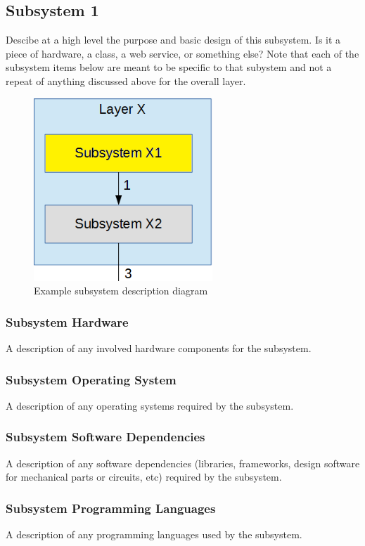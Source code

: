\subsection{Subsystem 1}
Descibe at a high level the purpose and basic design of this subsystem. Is it a piece of hardware, a class, a web service, or something else? Note that each of the subsystem items below are meant to be specific to that subystem and not a repeat of anything discussed above for the overall layer.

\begin{figure}[h!]
	\centering
 	\includegraphics[width=0.60\textwidth]{images/subsystem}
 \caption{Example subsystem description diagram}
\end{figure}

\subsubsection{Subsystem Hardware}
A description of any involved hardware components for the subsystem.

\subsubsection{Subsystem Operating System}
A description of any operating systems required by the subsystem.

\subsubsection{Subsystem Software Dependencies}
A description of any software dependencies (libraries, frameworks, design software for mechanical parts or circuits, etc) required by the subsystem.

\subsubsection{Subsystem Programming Languages}
A description of any programming languages used by the subsystem.

